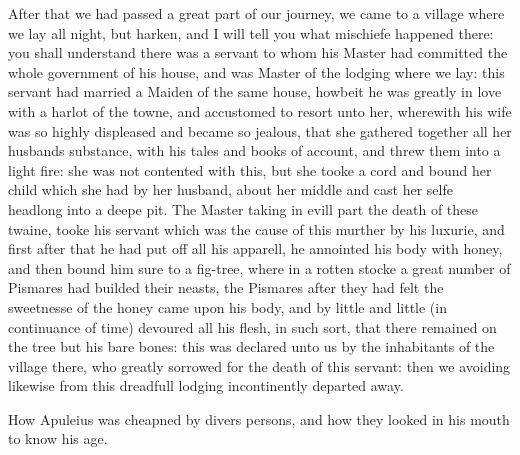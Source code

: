 After that we had passed a great part of our journey, we came to a village
where we lay all night, but harken, and I will tell you what mischiefe happened
there: you shall understand there was a servant to whom his Master had
committed the whole government of his house, and was Master of the lodging
where we lay: this servant had married a Maiden of the same house, howbeit he
was greatly in love with a harlot of the towne, and accustomed to resort unto
her, wherewith his wife was so highly displeased and became so jealous, that
she gathered together all her husbands substance, with his tales and books of
account, and threw them into a light fire: she was not contented with this, but
she tooke a cord and bound her child which she had by her husband, about her
middle and cast her selfe headlong into a deepe pit. The Master taking in evill
part the death of these twaine, tooke his servant which was the cause of this
murther by his luxurie, and first after that he had put off all his apparell,
he annointed his body with honey, and then bound him sure to a fig-tree, where
in a rotten stocke a great number of Pismares had builded their neasts, the
Pismares after they had felt the sweetnesse of the honey came upon his body,
and by little and little (in continuance of time) devoured all his flesh, in
such sort, that there remained on the tree but his bare bones: this was
declared unto us by the inhabitants of the village there, who greatly sorrowed
for the death of this servant: then we avoiding likewise from this dreadfull
lodging incontinently departed away.


How Apuleius was cheapned by divers persons, and how they looked in his mouth
to know his age.

